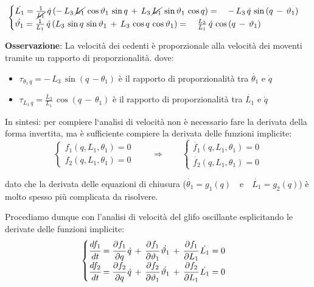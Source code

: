 		\[
		\begin{cases}
			\dot{L_1} = \frac{1}{\cancel{L_1}}\,\dot{q}\,(-\,L_3\,\cancel{L_1}\,\cos{\theta_1}\,\sin{q}\,+\,L_3\,\cancel{L_1}\,\sin{\theta_1}\,\cos{q}) =\quad -\,L_3\,\dot{q}\,\sin{(q\,-\,\theta_1)}\\
			\dot{\theta_1} = \frac{1}{L_1}\,\dot{q}\,(L_3\,\sin{q}\,\sin{\theta_1}\,+\,L_3\,\cos{q}\,\cos{\theta_1}) = \quad \frac{L_3}{L_1}\,\dot{q}\,\cos{(q\,-\,\theta_1)}
		\end{cases}
		\]
		
		\textbf{Osservazione}: La velocità dei cedenti è proporzionale alla velocità dei moventi tramite un rapporto di proporzionalità.
		dove:
		\begin{itemize}
		\item $\tau_{\theta_1\,q} = -\,L_3\,\sin{(q\,-\theta_1)}$ è il rapporto di proporzionalità tra $\dot{\theta_1}$ e $\dot{q}$
		\item $\tau_{L_1\,q} = \frac{L_3}{L_1}\,\cos{(q\,-\,\theta_1)}$ è il rapporto di proporzionalità tra $\dot{L_1}$ e $\dot{q}$
		\end{itemize}
		
		In sintesi: per compiere l`analisi di velocità non è necessario fare la derivata della forma invertita, ma è sufficiente compiere la derivata delle funzioni implicite:
		\[
		\begin{cases}
			f_1 (q, L_1, \theta_1) = 0\\
			f_2 (q, L_1, \theta_1) = 0
		\end{cases}
			\qquad
			\Rightarrow
			\qquad
		\begin{cases}
			\dot{f_1} (q, L_1, \theta_1) = 0\\
			\dot{f_2}(q, L_1, \theta_1) = 0
		\end{cases}
		\]
		
		dato che la derivata delle equazioni di chiusura ($\dot{\theta_1} = g_1(q)\quad \text{e} \quad \dot{L_1} = g_2(q)$) è molto spesso più complicata da risolvere.
		
		Procediamo dunque con l'analisi di velocità del glifo oscillante esplicitando le derivate delle funzioni implicite:
		\begin{equation*}
			\begin{cases}
				\td{f_1}{t} = \pd{f_1}{q}\,\dot{q}\,+\,\pd{f_1}{\theta_1}\,\dot{\theta_1}\,+\,\pd{f_1}{L_1}\,\dot{L_1} = 0\\
				\td{f_2}{t} = \pd{f_2}{q}\,\dot{q}\,+\,\pd{f_2}{\theta_1}\,\dot{\theta_1}\,+\,\pd{f_2}{L_1}\,\dot{L_1} = 0
			\end{cases}
		\end{equation*}
		
